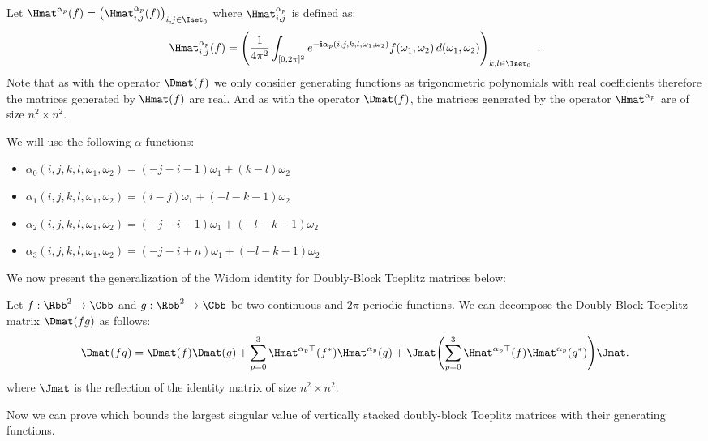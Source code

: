 Let $\Hmat^{\alpha_p} (f) = \leftmat \Hmat^{\alpha_p}_{i,j}(f) \rightmat_{i,j \in \Iset_0}$ where $\Hmat^{\alpha_p}_{i,j}$ is defined as:
\begin{equation}
  \Hmat^{\alpha_p}_{i,j}(f) =\leftmat \frac{1}{4\pi^{2}}\int_{[0,2\pi]^{2}} e^{-\ci \alpha_p(i, j, k, l, \omega_1, \omega_2)}  f(\omega_{1},\omega_{2})\,d(\omega_{1},\omega_{2})
  \rightmat_{k,l \in \Iset_0} \enspace.
\end{equation}
Note that as with the operator $\Dmat(f)$ we only consider generating functions as trigonometric polynomials with real coefficients therefore the matrices generated by $\Hmat(f)$ are real. 
And as with the operator $\Dmat(f)$, the matrices generated by the operator $\Hmat^{\alpha_p}$ are of size $n^2 \times n^2$. 

\noindent
We will use the following $\alpha$ functions:
\begin{itemize}
    \item[] $\alpha_0(i, j, k, l, \omega_1, \omega_2) = (-j-i-1)\omega_1 + (k-l)\omega_2$
    \item[] $\alpha_1(i, j, k, l, \omega_1, \omega_2) = (i-j)\omega_1 + (-l-k-1)\omega_2$
    \item[] $\alpha_2(i, j, k, l, \omega_1, \omega_2) = (-j-i-1)\omega_1 + (-l-k-1)\omega_2$
    \item[] $\alpha_3(i, j, k, l, \omega_1, \omega_2) = (-j-i+n)\omega_1 + (-l-k-1)\omega_2$
\end{itemize}

\noindent
We now present the generalization of the Widom identity for Doubly-Block Toeplitz matrices below:
\begin{lemma} \label{lemma:ch5-widom_idenity}
  Let $f:\Rbb^2 \rightarrow \Cbb$ and $g:\Rbb^2 \rightarrow \Cbb$ be two continuous and $2\pi$-periodic functions. 
  We can decompose the Doubly-Block Toeplitz matrix $\Dmat(fg)$ as follows:
  \begin{equation}
      \Dmat(fg) = \Dmat(f)\Dmat(g) + \sum_{p=0}^3 \Hmat^{\alpha_p \top}(f^*) \Hmat^{\alpha_p}(g) + \Jmat \left( \sum_{p=0}^3 \Hmat^{\alpha_p \top}(f) \Hmat^{\alpha_p }(g^*) \right) \Jmat.
  \end{equation}
  where $\Jmat$ is the reflection of the identity matrix of size $n^2 \times n^2$.
\end{lemma}

\noindent
Now we can prove  which bounds the largest singular value of vertically stacked doubly-block Toeplitz matrices with their generating functions. 

